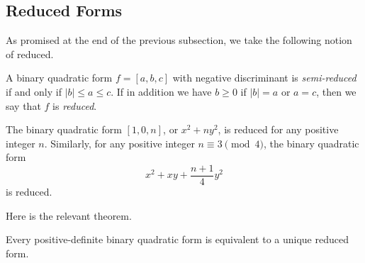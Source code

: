 \documentclass[../notes.tex]{subfiles}
\begin{document}
\subsection{Reduced Forms}
As promised at the end of the previous subsection, we take the following notion of reduced.
\begin{definition}[reduced]
	A binary quadratic form $f=[a,b,c]$ with negative discriminant is \textit{semi-re\-duced} if and only if $\left|b\right|\le a\le c$. If in addition we have $b\ge0$ if $\left|b\right|=a$ or $a=c$, then we say that $f$ is \textit{reduced}.
\end{definition}
\begin{example}
	The binary quadratic form $[1,0,n]$, or $x^2+ny^2$, is reduced for any positive integer $n$. Similarly, for any positive integer $n\equiv3\pmod4$, the binary quadratic form
	\[x^2+xy+\frac{n+1}4y^2\]
	is reduced.
\end{example}
Here is the relevant theorem.
\begin{theorem} \label{thm:reduce-form}
	Every positive-definite binary quadratic form is equivalent to a unique reduced form.
\end{theorem}
\end{document}
